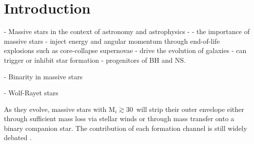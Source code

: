 \chapter{Introduction}\label{ch:introduction}


\cleardoublepage

- Massive stars in the context of astronomy and astrophysics
- - the importance of massive stars
  - inject energy and angular momentum through end-of-life explosions such as core-collapse supernovae
  - drive the evolution of galaxies
  - can trigger or inhibit star formation
  - progenitors of BH and NS.

- Binarity in massive stars

- Wolf-Rayet stars

As they evolve, massive stars with M$_i \gtrsim 30\,$\Msun{} will strip their outer envelope either through sufficient mass loss via stellar winds or through mass transfer onto a binary companion star. The contribution of each formation channel is still widely debated \citep{}.

